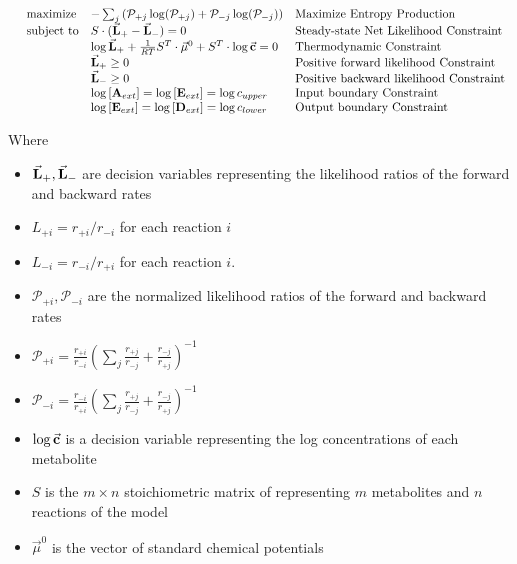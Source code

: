 \documentclass[10pt]{article}
\providecommand{\tightlist}{\setlength{\itemsep}{0pt}\setlength{\parskip}{0pt}}%
\begin{document}
\[
\begin{array}{llll}
  &  \text{maximize}  &  - \sum_j\left(\mathcal P_{+j}\log(\mathcal P_{+j}) +  \mathcal P_{-j}\log(\mathcal P_{-j})\right) & \text{Maximize Entropy Production}  \\
   & \text{subject to}  & S\cdot(\vec{\bf L}_+-\vec{\bf L}_-) = 0  &  \text{Steady-state Net Likelihood Constraint} \\
     &                  &\log\vec{\bf L}_+ +\frac{1}{RT}S^T\cdot\vec{\mu}^0 + S^T\cdot\log\vec{\bf c} = 0 & \text{Thermodynamic Constraint} \\
      &                   & \vec{\bf L}_+ \geq 0 & \text{Positive forward likelihood Constraint} \\
       &                  & \vec{\bf L}_- \geq 0 & \text{Positive backward likelihood Constraint} \\
        &              & \log \left[{\bf A}_{ext}\right] = \log \left[{\bf E}_{ext}\right] =  \log c_{upper} & \text{Input boundary Constraint} \\
       &               & \log \left[{\bf E}_{ext}\right] = \log \left[{\bf D}_{ext}\right] = \log c_{lower}  & \text{Output boundary Constraint} \\         
\end{array}\]



Where~

\begin{itemize}
\tightlist
\item
  \(\vec{\bf L}_+,\vec{\bf L}_-\) are decision variables representing the likelihood
  ratios of the forward and backward rates
\item
  \(L_{+i} = r_{+i}/r_{-i}\) for each reaction \(i\)
\item
  \(L_{-i} = r_{-i}/r_{+i}\) for each reaction \(i\).
\item
  \(\displaystyle {\mathcal P}_{+i},{\mathcal P}_{-i}\) are the normalized likelihood ratios of the forward
  and backward rates
\item
  \(\displaystyle \mathcal P_{+i} = \frac{r_{+i}}{r_{-i}}\left(\sum_j\frac{r_{+j}}{r_{-j}} + \frac{r_{-j}}{r_{+j}}\right)^{-1}\)
\item
  \(\displaystyle \mathcal P_{-i} = \frac{r_{-i}}{r_{+i}}\left(\sum_j\frac{r_{+j}}{r_{-j}} + \frac{r_{-j}}{r_{+j}}\right)^{-1}\)
\item
  \(\log\vec{\bf c}\) is a decision variable representing the log
  concentrations of each metabolite
\item
  \(S\) is the \(m\times n\) stoichiometric matrix
  of representing \(m\) metabolites and
  \(n\) reactions of the model\\
\item
  \(\vec{\mu}^0\) is the vector of standard chemical potentials
\end{itemize}
\end{document}
